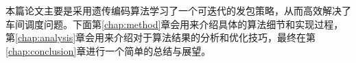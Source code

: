 本篇论文主要是采用遗传编码算法学习了一个可迭代的发包策略，从而高效解决了车间调度问题。下面第\ref{chap:method}章会用来介绍具体的算法细节和实现过程，第\ref{chap:analysis}章会用来介绍对于算法结果的分析和优化技巧，最终在第\ref{chap:conclusion}章进行一个简单的总结与展望。